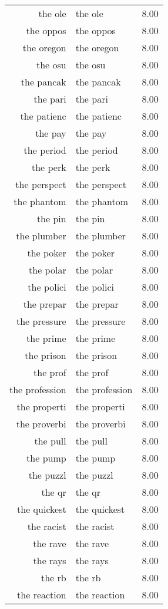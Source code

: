 \begin{table}[ht]
\begin{tabular}{rlr}
  the ole & the ole & 8.00 \\ 
  the oppos & the oppos & 8.00 \\ 
  the oregon & the oregon & 8.00 \\ 
  the osu & the osu & 8.00 \\ 
  the pancak & the pancak & 8.00 \\ 
  the pari & the pari & 8.00 \\ 
  the patienc & the patienc & 8.00 \\ 
  the pay & the pay & 8.00 \\ 
  the period & the period & 8.00 \\ 
  the perk & the perk & 8.00 \\ 
  the perspect & the perspect & 8.00 \\ 
  the phantom & the phantom & 8.00 \\ 
  the pin & the pin & 8.00 \\ 
  the plumber & the plumber & 8.00 \\ 
  the poker & the poker & 8.00 \\ 
  the polar & the polar & 8.00 \\ 
  the polici & the polici & 8.00 \\ 
  the prepar & the prepar & 8.00 \\ 
  the pressure & the pressure & 8.00 \\ 
  the prime & the prime & 8.00 \\ 
  the prison & the prison & 8.00 \\ 
  the prof & the prof & 8.00 \\ 
  the profession & the profession & 8.00 \\ 
  the properti & the properti & 8.00 \\ 
  the proverbi & the proverbi & 8.00 \\ 
  the pull & the pull & 8.00 \\ 
  the pump & the pump & 8.00 \\ 
  the puzzl & the puzzl & 8.00 \\ 
  the qr & the qr & 8.00 \\ 
  the quickest & the quickest & 8.00 \\ 
  the racist & the racist & 8.00 \\ 
  the rave & the rave & 8.00 \\ 
  the rays & the rays & 8.00 \\ 
  the rb & the rb & 8.00 \\ 
  the reaction & the reaction & 8.00 \\ 

\end{tabular}
\end{table}
